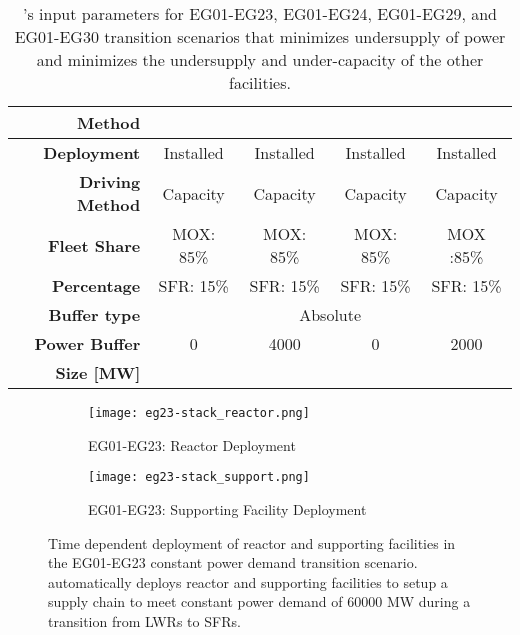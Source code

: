 \begin{table}[]
{\begin{tabular}{r|cccc}
	\textbf{Method} \\ \hline 
	\textbf{Deployment}   & Installed & Installed  & Installed   & Installed    \\                                                                                                                                                                                 
	\textbf{Driving Method} & Capacity & Capacity  & Capacity   & Capacity \\ \hline 
	\textbf{Fleet Share} &  MOX: 85\% &  MOX: 85\% &  MOX: 85\% &  MOX :85\%     \\
	\textbf{Percentage} &SFR: 15\%&SFR: 15\%&SFR: 15\%&SFR: 15\%\\ \hline
	\textbf{Buffer type}                                                    & \multicolumn{4}{c}{Absolute}                                                                                                                                                                                                                                                               \\ \hline
	\textbf{Power Buffer}                                                  & 0 & 4000 & 0 & 2000 \\ 
	\textbf{Size [MW]} \\ \hline \end{tabular}}
	\caption{\deploy's input parameters for EG01-EG23, EG01-EG24, EG01-EG29, and 
	EG01-EG30 transition scenarios
	that minimizes undersupply of power and minimizes 
	the undersupply and under-capacity of the other facilities. }
	\label{tab:bestinputs}
	\end{table}

\begin{figure}[]
	\centering
	\begin{subfigure}[t]{1\textwidth}
		\centering
		\texttt{[image: eg23-stack\_reactor.png]} 
		\caption{EG01-EG23: Reactor Deployment}
		\label{fig:23reactor}
	\end{subfigure}
	\begin{subfigure}[t]{1\textwidth}
		\centering
		\texttt{[image: eg23-stack\_support.png]} 
		\caption{EG01-EG23: Supporting Facility Deployment}
		\label{fig:23support}
	\end{subfigure}
	\hfill
	\caption{Time dependent deployment of reactor and supporting facilities in 
	the EG01-EG23 constant power demand transition scenario. 
	\deploy automatically deploys reactor and supporting facilities 
	to setup a supply chain to meet constant power demand of $60000$ MW
	during a transition from \glspl{LWR} to \glspl{SFR}. }
	\label{fig:23stack}
\end{figure}

